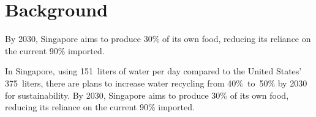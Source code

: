 \section*{%
  Background
 }
\setlength{\ColumnGap}{1cm}
\setlength{\MinipageGap}{1cm}
\setlength{\HalfLineWidth}{0.5\linewidth}
\setlength{\MinipageAWidth}{\dimexpr ((0.2\HalfLineWidth) - (0.5\ColumnGap))\relax}
\setlength{\MinipageBWidth}{\dimexpr (\HalfLineWidth - \MinipageAWidth - \MinipageGap - (0.5\ColumnGap))\relax}
\setlength{\columnsep}{\ColumnGap}%
\begin{multicols}{2}
	\begin{minipage}{\MinipageAWidth}
	\end{minipage}
	\hspace{\MinipageGap}%
	\begin{minipage}{\MinipageBWidth}
		By 2030, Singapore aims to produce 30\% of its own food, reducing its reliance on the current 90\% imported.
	\end{minipage}
	\columnbreak%
	\begin{minipage}[t]{\linewidth}
		\begin{minipage}{\MinipageAWidth}
		\end{minipage}
		\hspace{\MinipageGap}%
		\begin{minipage}{\MinipageBWidth}
			In Singapore, using 151~liters of water per day compared to the United States' 375~liters, there are plans to increase water recycling from 40\%~to~50\% by 2030 for sustainability. By 2030, Singapore aims to produce 30\% of its own food, reducing its reliance on the current 90\% imported.
		\end{minipage}
	\end{minipage}
\end{multicols}
\vfill
\columnbreak%
